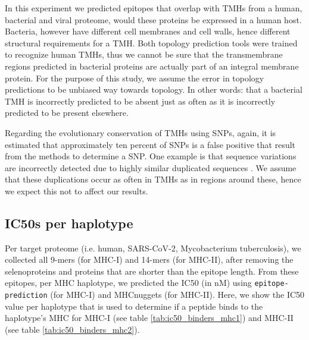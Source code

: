 
In this experiment we predicted epitopes that overlap with 
TMHs from a human, bacterial and viral proteome,
would these proteins be expressed in a human host.
Bacteria, however have different cell membranes and cell walls, 
hence different structural requirements for a TMH.
Both topology prediction tools were trained to recognize
human TMHs, thus we cannot be sure that
the transmembrane regions predicted in bacterial proteins
are actually part of an integral membrane protein.
For the purpose of this study, we assume the 
error in topology predictions to be unbiased way towards topology.
In other words: that a bacterial TMH is incorrectly
predicted to be absent just as often as it is incorrectly
predicted to be present elsewhere.


Regarding the evolutionary conservation of TMHs using SNPs,
again, it is estimated that approximately ten percent
of SNPs is a false positive that result from the methods to determine
a SNP. One example is that sequence variations are incorrectly
detected due to highly similar duplicated sequences \cite{musumeci2010single}.
We assume that these duplications occur as often in TMHs as in
regions around these, hence we expect this not to affect our results.

\subsection{IC50s per haplotype}
\label{subsec:ic50s_per_haplotype}

Per target proteome (i.e. human, SARS-CoV-2, Mycobacterium tuberculosis),
we collected all 9-mers (for MHC-I) and 14-mers (for MHC-II),
after removing the selenoproteins and proteins that are shorter
than the epitope length.
From these epitopes, per MHC haplotype,
we predicted the IC50 (in nM) using \verb;epitope-prediction; (for MHC-I)
and MHCnuggets (for MHC-II). 
Here, we show the IC50 value per haplotype that
is used to determine if a peptide binds to the haplotype's MHC
for MHC-I (see table \ref{tab:ic50_binders_mhc1}) and 
MHC-II (see table \ref{tab:ic50_binders_mhc2}).

